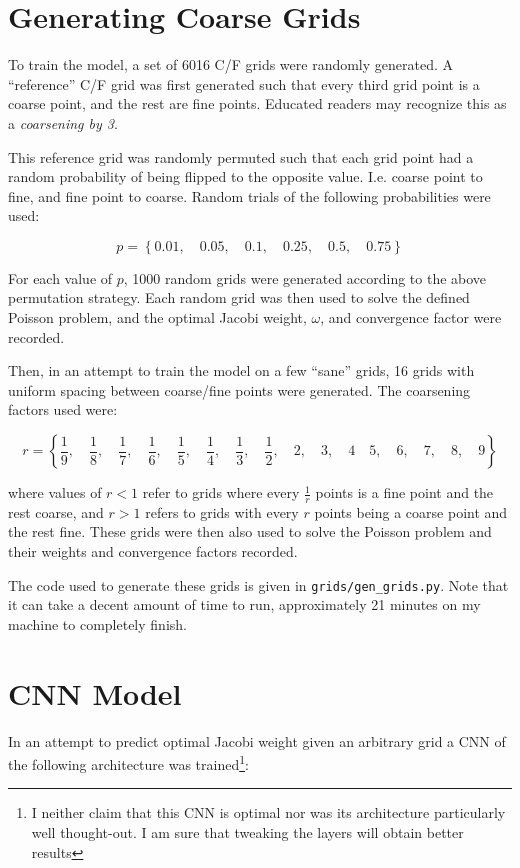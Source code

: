\section{Generating Coarse Grids}

To train the model, a set of 6016 C/F grids were randomly generated.  A ``reference'' C/F grid was first generated such that every third grid point is a coarse point, and the rest are fine points.  Educated readers may recognize this as a \textit{coarsening by 3}.

This reference grid was randomly permuted such that each grid point had a random probability of being flipped to the opposite value.  I.e. coarse point to fine, and fine point to coarse.  Random trials of the following probabilities were used:

$$ p = \left\{0.01, \quad 0.05, \quad 0.1, \quad 0.25, \quad 0.5, \quad 0.75\right\} $$

For each value of $p$, 1000 random grids were generated according to the above permutation strategy.  Each random grid was then used to solve the defined Poisson problem, and the optimal Jacobi weight, $\omega$, and convergence factor were recorded.

Then, in an attempt to train the model on a few ``sane'' grids, 16 grids with uniform spacing between coarse/fine points were generated.  The coarsening factors used were:

$$r = \left\{
\frac{1}{9},\quad
\frac{1}{8},\quad
\frac{1}{7},\quad
\frac{1}{6},\quad
\frac{1}{5},\quad
\frac{1}{4},\quad
\frac{1}{3},\quad
\frac{1}{2},\quad
2,\quad
3,\quad
4\quad
5,\quad
6,\quad
7,\quad
8,\quad
9
\right\}$$

where values of $r<1$ refer to grids where every $\frac{1}{r}$ points is a fine point and the rest coarse, and $r>1$ refers to grids with every $r$ points being a coarse point and the rest fine.  These grids were then also used to solve the Poisson problem and their weights and convergence factors recorded.

The code used to generate these grids is given in \texttt{grids/gen\_grids.py}.  Note that it can take a decent amount of time to run, approximately 21 minutes on my machine to completely finish.

\section{CNN Model}

In an attempt to predict optimal Jacobi weight given an arbitrary grid a CNN of the following architecture was trained\footnote{I neither claim that this CNN is optimal nor was its architecture particularly well thought-out.  I am sure that tweaking the layers will obtain better results}:

